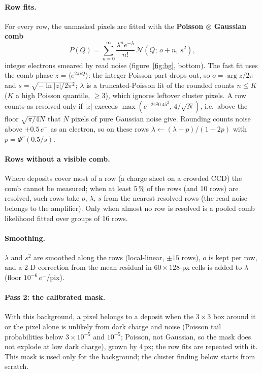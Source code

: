 \documentclass[11pt,a4paper]{article}
\newcommand{\el}{\ensuremath{e^-}}
\newcommand{\N}{\mathcal{N}}
\begin{document}
\paragraph{Row fits.} For every row, the unmasked pixels are fitted with the \textbf{Poisson $\otimes$ Gaussian comb}
\begin{equation}
P(Q)=\sum_{n=0}^{\infty}\frac{\lambda^n e^{-\lambda}}{n!}\,\N\!\left(Q;\,o+n,\,s^2\right),
\end{equation}
integer electrons smeared by read noise (figure~\ref{fig:bg}, bottom). The fast fit uses the comb phase
$z=\langle e^{2\pi iQ}\rangle$: the integer Poisson part drops out, so $o=\arg z/2\pi$ and $s=\sqrt{-\ln|z|/2\pi^2}$; $\lambda$ is a
truncated-Poisson fit of the rounded counts $n\le K$ ($K$ a high Poisson quantile, $\ge3$), which ignores leftover cluster
pixels. A row counts as resolved only if $|z|$ exceeds $\max(e^{-2\pi^2 0.45^2},\,4/\sqrt N)$, i.e.\ above the floor
$\sqrt{\pi/4N}$ that $N$ pixels of pure Gaussian noise give. Rounding counts noise above $+0.5$\,\el{} as an electron, so on
these rows $\lambda\leftarrow(\lambda-p)/(1-2p)$ with $p=\Phi^c(0.5/s)$.

\paragraph{Rows without a visible comb.} Where deposits cover most of a row (a charge sheet on a crowded CCD) the comb
cannot be measured; when at least 5\,\% of the rows (and 10 rows) are resolved, such rows take $o$, $\lambda$, $s$ from the
nearest resolved rows (the read noise belongs to the amplifier). Only when almost no row is resolved is a pooled comb
likelihood fitted over groups of 16 rows.

\paragraph{Smoothing.} $\lambda$ and $s^2$ are smoothed along the rows (local-linear, $\pm15$ rows), $o$ is kept per row,
and a 2-D correction from the mean residual in $60\times128$-px cells is added to $\lambda$ (floor $10^{-6}$\,\el/pix).

\paragraph{Pass 2: the calibrated mask.} With this background, a pixel belongs to a deposit when the $3\times3$ box around it
or the pixel alone is unlikely from dark charge and noise (Poisson tail probabilities below $3\times10^{-5}$ and $10^{-5}$;
Poisson, not Gaussian, so the mask does not explode at low dark charge), grown by 4\,px; the row fits are repeated with it.
This mask is used only for the background; the cluster finding below starts from scratch.
\end{document}
